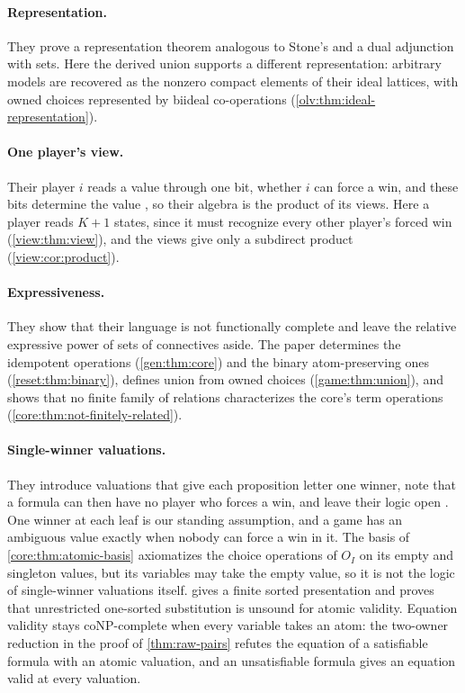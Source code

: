 \paragraph{Representation.} They prove a representation theorem analogous to Stone's \cite[Theorem~3.28]{OldeLoohuisVenema2010} and a dual adjunction with sets. Here the derived union supports a different representation: arbitrary models are recovered as the nonzero compact elements of their ideal lattices, with owned choices represented by biideal co-operations (\cref{olv:thm:ideal-representation}).



\paragraph{One player's view.} Their player $i$ reads a value through one bit, whether $i$ can force a win, and these bits determine the value \cite[Proposition~3.26]{OldeLoohuisVenema2010}, so their algebra is the product of its views. Here a player reads $K+1$ states, since it must recognize every other player's forced win (\cref{view:thm:view}), and the views give only a subdirect product (\cref{view:cor:product}).

\paragraph{Expressiveness.} They show that their language is not functionally complete and leave the relative expressive power of sets of connectives aside. The paper determines the idempotent operations (\cref{gen:thm:core}) and the binary atom-preserving ones (\cref{reset:thm:binary}), defines union from owned choices (\cref{game:thm:union}), and shows that no finite family of relations characterizes the core's term operations (\cref{core:thm:not-finitely-related}).

\paragraph{Single-winner valuations.} They introduce valuations that give each proposition letter one winner, note that a formula can then have no player who forces a win, and leave their logic open \cite[Definition~2.12]{OldeLoohuisVenema2010}. One winner at each leaf is our standing assumption, and a game has an ambiguous value exactly when nobody can force a win in it. The basis of \cref{core:thm:atomic-basis} axiomatizes the choice operations of $O_I$ on its empty and singleton values, but its variables may take the empty value, so it is not the logic of single-winner valuations itself.  gives a finite sorted presentation and proves that unrestricted one-sorted substitution is unsound for atomic validity. Equation validity stays coNP-complete when every variable takes an atom: the two-owner reduction in the proof of \cref{thm:raw-pairs} refutes the equation of a satisfiable formula with an atomic valuation, and an unsatisfiable formula gives an equation valid at every valuation.

